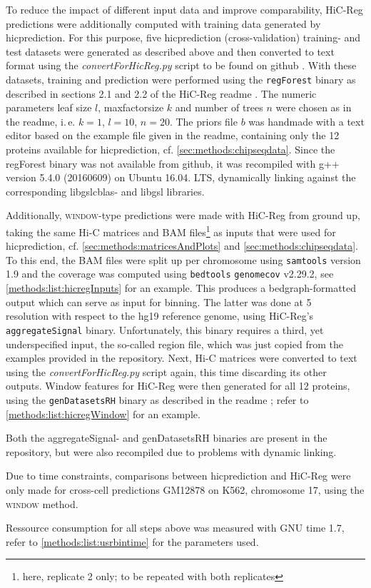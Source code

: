 To reduce the impact of different input data and improve comparability, 
HiC-Reg predictions were additionally computed with training data 
generated by hicprediction.
For this purpose, five hicprediction (cross-validation) training- and test datasets were generated as described above and then 
converted to text format using the \emph{convertForHicReg.py} script to be found on github \cite{Krauth2020}.
With these datasets, training and prediction were performed using the \texttt{regForest} binary as 
described in sections 2.1 and 2.2 of the HiC-Reg readme \cite{Roy2020}.
The numeric parameters leaf size $l$, maxfactorsize $k$ and number of trees $n$ were
chosen as in the readme, i.\,e. $k=1$, $l=10$, $n=20$.
The priors file $b$ was handmade with a text editor based on the example file given
in the readme, containing only the 12 proteins available for hicprediction, cf. \autoref{sec:methods:chipseqdata}.
Since the regForest binary was not available from github, it was recompiled
with g++ version 5.4.0 (20160609) on Ubuntu 16.04. LTS, dynamically linking against the
corresponding libgslcblas- and libgsl libraries.

Additionally, \textsc{window}-type predictions were made with HiC-Reg from ground up,
taking the same Hi-C matrices and BAM files\footnote{here, replicate 2 only; to be repeated with both replicates} 
as inputs that were used for hicprediction, 
cf. \autoref{sec:methods:matricesAndPlots} and \ref{sec:methods:chipseqdata}.
To this end, the BAM files were split up 
per chromosome using \texttt{samtools} version 1.9
and the coverage was computed using \texttt{bedtools} \texttt{genomecov} v2.29.2, 
see \autoref{methods:list:hicregInputs} for an example. 
This produces a bedgraph-formatted output which can serve as input for binning.
The latter was done at \SI{5}{\kilo\bp} resolution with respect to the hg19 reference genome, 
using HiC-Reg's \texttt{aggregateSignal} binary. 
Unfortunately, this binary requires a third, yet underspecified input, 
the so-called region file, which was just copied from the examples provided in the repository.
Next, Hi-C matrices were converted to text using the \emph{convertForHicReg.py} script again, this time discarding its other outputs.
Window features for HiC-Reg were then generated for all 12 proteins,
using the \texttt{genDatasetsRH} binary as described in the readme \cite{Roy2020}; refer to \autoref{methods:list:hicregWindow} for an example.

Both the aggregateSignal- and genDatasetsRH binaries are present in the repository, 
but were also recompiled due to problems with dynamic linking. 

Due to time constraints, comparisons between hicprediction and HiC-Reg 
were only made for cross-cell predictions GM12878 on K562, chromosome 17,
using the \textsc{window} method.

Ressource consumption for all steps above 
was measured with GNU time 1.7, refer to \autoref{methods:list:usrbintime} for the parameters used.




